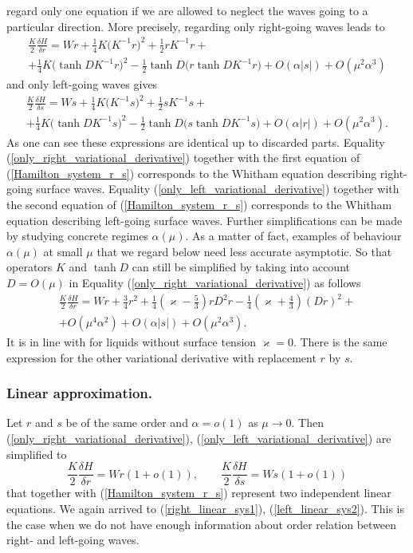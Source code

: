 regard only one equation if we are allowed to neglect the waves
going to a particular direction.
More precisely, regarding only right-going waves leads to
%
\begin{multline}
\label{only_right_variational_derivative}
	\frac{K}{2} \frac{\delta H}{\delta r}
	=
	Wr + \frac 14 K \big( K^{-1} r \big)^2 +
	\frac 12 r K^{-1} r
	+
	\\
	+
	\frac 14 K \big( \tanh D K^{-1} r \big)^2 -
	\frac 12 \tanh D \big( r \tanh D K^{-1} r \big)
	+ O(\alpha |s|) + O(\mu^2 \alpha^3)
\end{multline}
%
and only left-going waves gives
%
\begin{multline}
\label{only_left_variational_derivative}
	\frac{K}{2} \frac{\delta H}{\delta s}
	=
	Ws + \frac 14 K \big( K^{-1} s \big)^2 +
	\frac 12 s K^{-1} s
	+
	\\
	+
	\frac 14 K \big( \tanh D K^{-1} s \big)^2 -
	\frac 12 \tanh D \big( s \tanh D K^{-1} s \big)
	+ O(\alpha |r|) + O(\mu^2 \alpha^3)
	.
\end{multline}
%
As one can see these expressions are identical up to discarded parts.
Equality (\ref{only_right_variational_derivative}) together with the
first equation of (\ref{Hamilton_system_r_s}) corresponds to the
Whitham equation describing right-going surface waves.
Equality (\ref{only_left_variational_derivative}) together with the
second equation of (\ref{Hamilton_system_r_s}) corresponds to the
Whitham equation describing left-going surface waves.
Further simplifications can be made by studying
concrete regimes $\alpha(\mu)$.
As a matter of fact, examples of behaviour $\alpha(\mu)$ at small $\mu$
that we regard below need less accurate asymptotic.
So that operators $K$ and $\tanh D$ can still be simplified by
taking into account $D = O(\mu)$ in Equality
(\ref{only_right_variational_derivative}) as follows
%
\begin{multline}
\label{simplified_variational_derivative}
	\frac{K}{2} \frac{\delta H}{\delta r}
	=
	Wr + \frac 34 r^2 +
	\frac 14 \left( \varkappa - \frac 53 \right) r D^2 r
	-
	\frac 14 \left( \varkappa + \frac 43 \right) (D r)^2
	+
	\\
	+
	O(\mu^4 \alpha^2) + O(\alpha |s|) + O(\mu^2 \alpha^3)
	.
\end{multline}
%
It is in line with \cite{Moldabayev2015} for liquids
without surface tension $\varkappa = 0$.
There is the same expression for the other variational derivative
with replacement $r$ by $s$.
%
%
\subsubsection{Linear approximation.}
%
%
Let $r$ and $s$ be of the same order and $\alpha = o(1)$ as $\mu \to 0$.
Then (\ref{only_right_variational_derivative}),
(\ref{only_left_variational_derivative}) are simplified to
%
\[
	\frac{K}{2} \frac{\delta H}{\delta r} = Wr (1 + o(1))
	, \qquad
	\frac{K}{2} \frac{\delta H}{\delta s} = Ws (1 + o(1))
\]
%
that together with (\ref{Hamilton_system_r_s}) represent two
independent linear equations.
We again arrived to (\ref{right_linear_sys1}), (\ref{left_linear_sys2}).
This is the case when we do not have enough information about
order relation between right- and left-going waves.
%
%
